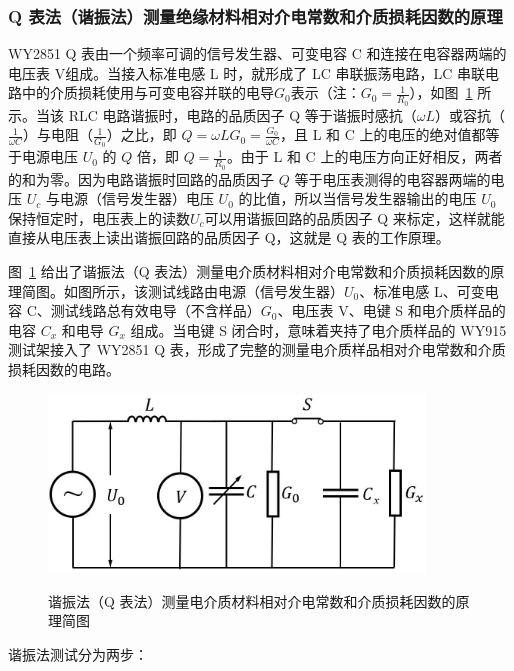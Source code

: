 \documentclass[a4paper,utf8]{article}
\newcommand{\fgref}[1]{图~\ref{#1} }
\begin{document}
        \subsubsection{Q 表法（谐振法）测量绝缘材料相对介电常数和介质损耗因数的原理}
            WY2851 Q 表由一个频率可调的信号发生器、可变电容 C 和连接在电容器两端的电压表 V组成。当接入标准电感 L 时，就形成了 LC 串联振荡电路，LC 串联电路中的介质损耗使用与可变电容并联的电导$G_0$表示（注：$G_0=\frac{1}{R_0}$），如\fgref{fig:4} 所示。当该 RLC 电路谐振时，电路的品质因子 Q 等于谐振时感抗（$\omega L$）或容抗（$\frac{1}{\omega C}$）与电阻（$\frac{1}{G_0}$）之比，即 $Q = \omega L G_0 =\frac{G_0}{\omega C}$，且 L 和 C 上的电压的绝对值都等于电源电压 $U_0$ 的 $Q$ 倍，即 $Q = \frac{1}{R_0}$。由于 L 和 C 上的电压方向正好相反，两者的和为零。因为电路谐振时回路的品质因子 $Q$ 等于电压表测得的电容器两端的电压 $U_c$ 与电源（信号发生器）电压 $U_0$ 的比值，所以当信号发生器输出的电压 $U_0$ 保持恒定时，电压表上的读数$U_c$可以用谐振回路的品质因子 Q 来标定，这样就能直接从电压表上读出谐振回路的品质因子 Q，这就是 Q 表的工作原理。\par
            \fgref{fig:4}给出了谐振法（Q 表法）测量电介质材料相对介电常数和介质损耗因数的原理简图。如图所示，该测试线路由电源（信号发生器）$U_0$、标准电感 L、可变电容 C、测试线路总有效电导（不含样品）$G_0$、电压表 V、电键 S 和电介质样品的电容 $C_x$ 和电导 $G_x$ 组成。当电键 S 闭合时，意味着夹持了电介质样品的 WY915 测试架接入了 WY2851 Q 表，形成了完整的测量电介质样品相对介电常数和介质损耗因数的电路。
            \begin{figure}[!ht]\centering
                \includegraphics[width=100mm]{fg4.jpg}\
                \caption{谐振法（Q 表法）测量电介质材料相对介电常数和介质损耗因数的原理简图\label{fig:4}}
            \end{figure}\par
            谐振法测试分为两步：
\end{document}
